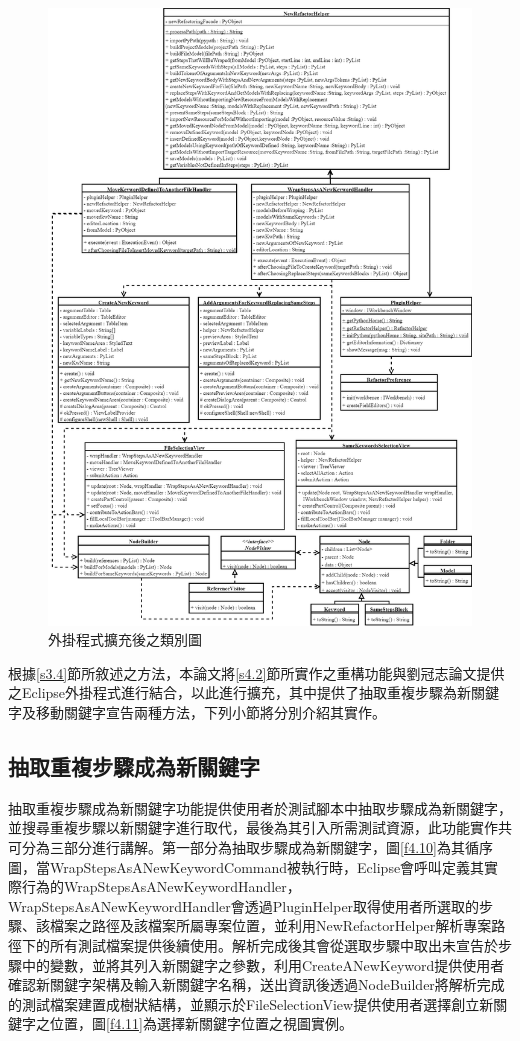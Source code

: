 \begin{figure}[H]
	\centering
    \includegraphics[width=1.0\textwidth]{picture/ch4/expanded_plugin_class_diagram.png}
    \caption{外掛程式擴充後之類別圖}
    \label{f4.9}
\end{figure}

\indent
根據\ref{s3.4}節所敘述之方法，本論文將\ref{s4.2}節所實作之重構功能與劉冠志論文\cite{LIU-Thesis}提供之Eclipse外掛程式進行結合，以此進行擴充，其中提供了抽取重複步驟為新關鍵字及移動關鍵字宣告兩種方法，下列小節將分別介紹其實作。

\subsection{抽取重複步驟成為新關鍵字}
\indent
抽取重複步驟成為新關鍵字功能提供使用者於測試腳本中抽取步驟成為新關鍵字，並搜尋重複步驟以新關鍵字進行取代，最後為其引入所需測試資源，此功能實作共可分為三部分進行講解。第一部分為抽取步驟成為新關鍵字，圖\ref{f4.10}為其循序圖，當WrapStepsAsANewKeywordCommand被執行時，Eclipse會呼叫定義其實際行為的WrapStepsAsANewKeywordHandler，WrapStepsAsANewKeywordHandler會透過PluginHelper取得使用者所選取的步驟、該檔案之路徑及該檔案所屬專案位置，並利用NewRefactorHelper解析專案路徑下的所有測試檔案提供後續使用。解析完成後其會從選取步驟中取出未宣告於步驟中的變數，並將其列入新關鍵字之參數，利用CreateANewKeyword提供使用者確認新關鍵字架構及輸入新關鍵字名稱，送出資訊後透過NodeBuilder將解析完成的測試檔案建置成樹狀結構，並顯示於FileSelectionView提供使用者選擇創立新關鍵字之位置，圖\ref{f4.11}為選擇新關鍵字位置之視圖實例。

